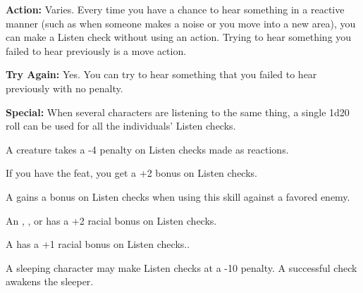\textbf{Action:} Varies. Every time you have a chance to hear something in a reactive 
manner (such as when someone makes a noise or you move into a new area), you can 
make a Listen check without using an action. Trying to hear something you failed 
to hear previously is a move action.

\textbf{Try Again:} Yes. You can try to hear something that you failed to hear 
previously with no penalty.

\textbf{Special:} When several characters are listening to the same thing, a single 
1d20 roll can be used for all the individuals' Listen checks.

A  creature takes a -4 penalty on Listen checks made as reactions.

If you have the  feat, you get a +2 bonus on Listen checks.

A  gains a bonus on Listen checks when using this skill against a favored 
enemy.

An , , or  has a +2 racial bonus on Listen checks. 

A  has a +1 racial bonus on Listen checks..

A sleeping character may make Listen checks at a -10 penalty. A successful check 
awakens the sleeper.
